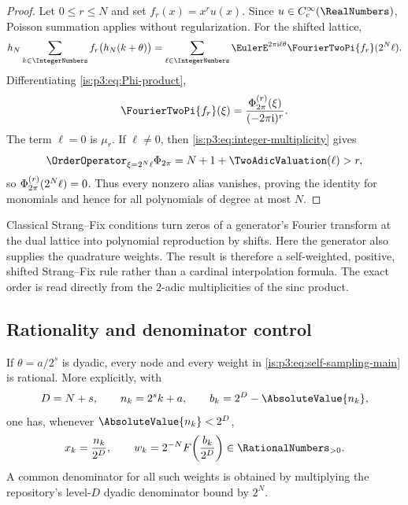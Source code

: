 \begin{proof}
Let $0\le r\le N$ and set $f_r(x)=x^ru(x)$.  Since $u\in C_c^\infty(\RealNumbers)$, Poisson summation applies without regularization.  For the shifted lattice,
\begin{equation}
 h_N\sum_{k\in\IntegerNumbers}f_r\bigl(h_N(k+\theta)\bigr)
 =\sum_{\ell\in\IntegerNumbers}\EulerE^{2\pi\iu\ell\theta}
 \FourierTwoPi{f_r}(2^N\ell).
 \label{is:p3:eq:shifted-Poisson}
\end{equation}
Differentiating \eqref{is:p3:eq:Phi-product},
\begin{equation}
 \FourierTwoPi{f_r}(\xi)=\frac{\PhiCyc^{(r)}(\xi)}{(-2\pi\iu)^r}.
 \label{is:p3:eq:monomial-transform}
\end{equation}
The term $\ell=0$ is $\mu_r$.  If $\ell\ne0$, then \eqref{is:p3:eq:integer-multiplicity} gives
\[
 \OrderOperator_{\xi=2^N\ell}\PhiCyc
 =N+1+\TwoAdicValuation(\ell)>r,
\]
so $\Phi_{2\pi}^{(r)}(2^N\ell)=0$.  Thus every nonzero alias vanishes, proving the identity for monomials and hence for all polynomials of degree at most $N$.
\end{proof}

\begin{remark}
Classical Strang--Fix conditions turn zeros of a generator's Fourier transform at the dual lattice into polynomial reproduction by shifts.  Here the generator also supplies the quadrature weights.  The result is therefore a self-weighted, positive, shifted Strang--Fix rule rather than a cardinal interpolation formula.  The exact order is read directly from the $2$-adic multiplicities of the sinc product.
\end{remark}

\subsection{Rationality and denominator control}

\begin{corollary}
\label{is:p3:cor:rational-rules}
If $\theta=a/2^s$ is dyadic, every node and every weight in \eqref{is:p3:eq:self-sampling-main} is rational.  More explicitly, with
\[
 D=N+s,
 \qquad n_k=2^sk+a,
 \qquad b_k=2^D-\AbsoluteValue{n_k},
\]
one has, whenever $\AbsoluteValue{n_k}<2^D$,
\begin{equation}
 x_k=\frac{n_k}{2^D},
 \qquad
 w_k=2^{-N}F\!\left(\frac{b_k}{2^D}\right)\in\RationalNumbers_{>0}.
 \label{is:p3:eq:rational-weights}
\end{equation}
A common denominator for all such weights is obtained by multiplying the repository's level-$D$ dyadic denominator bound by $2^N$.
\end{corollary}

